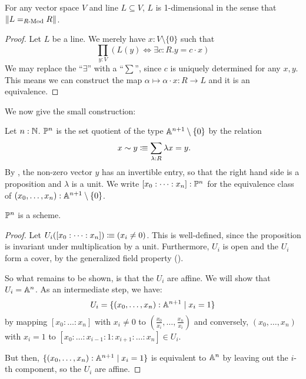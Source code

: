 \begin{proposition}%
  \label{lines-are-one-dimensional}
  For any vector space $V$ and line $L\subseteq V$,
  $L$ is 1-dimensional in the sense that $\lVert L=_{R\text{-}\mathrm{Mod}}R \rVert$.
\end{proposition}

\begin{proof}
  Let $L$ be a line.
  We merely have $x:V\setminus\{0\}$ such that 
  \[ \prod_{y:V}\left(L (y) \Leftrightarrow \exists c:R.y=c\cdot x\right)\]
  We may replace the ``$\exists$'' with a ``$\sum$'',
  since $c$ is uniquely determined for any $x,y$.
  This means we can construct the map $\alpha\mapsto \alpha\cdot x:R\to L$ and it is an equivalence.
\end{proof}

We now give the small construction:

\begin{definition}%
  \label{projective-space-hit}
  Let $n:\mathbb{N}$.
   $\mathbb{P}^n$ is the set quotient of the type $\mathbb{A}^{n+1}\setminus\{0\}$ by the relation
  \[
    x \sim y \colonequiv \sum_{\lambda : R} \lambda x=y\rlap{.}
  \]
  By , the non-zero vector $y$ has an invertible entry,
  so that the right hand side is a proposition and $\lambda$ is a unit.
  We write $[x_0:\dots:x_n]:\mathbb{P}^n$ for the equivalence class of $(x_0,\dots,x_n):\mathbb{A}^{n+1}\setminus\{0\}$.
\end{definition}

\begin{theorem}%
  \label{projective-space-is-scheme}
  $\mathbb{P}^n$ is a scheme.
\end{theorem}

\begin{proof}
  Let $U_i([x_0:\dots:x_n])\vcentcolon\mspace{-1.2mu}\equiv (x_i\neq 0)$.
  This is well-defined, since the proposition is invariant under multiplication by a unit.
  Furthermore, $U_i$ is open and the $U_i$ form a cover,
  by the generalized field property
  ().

  So what remains to be shown, is that the $U_i$ are affine.
  We will show that $U_i=\mathbb{A}^n$.
  As an intermediate step, we have:
  \[
    U_i=\{(x_0,\dots,x_n):\mathbb{A}^{n+1}\mid x_i=1\}
  \]
  by mapping $[x_0:\dots:x_n]$ with $x_i\neq 0$
  to $\left(\frac{x_0}{x_i},\dots,\frac{x_n}{x_i}\right)$
  and conversely, $(x_0,\dots,x_n)$ with $x_i=1$ to $[x_0:\dots:x_{i-1}:1:x_{i+1}:\dots:x_n]\in U_i$.

  But then, $\{(x_0,\dots,x_n):\mathbb{A}^{n+1}\mid x_i=1\}$
  is equivalent to $\mathbb{A}^n$ by leaving out the $i$-th component,
  so the $U_i$ are affine.
\end{proof}

